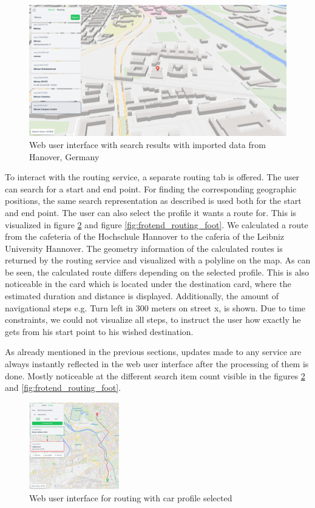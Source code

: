 \documentclass[conference]{IEEEtran}
\begin{document}
\begin{figure}[h]
    \centering
    \includegraphics[width=\textwidth]{figures/Mensa.png}
    \caption{Web user interface with search results with imported data from Hanover, Germany}
    \label{fig:frontend_search}
\end{figure}

To interact with the routing service, a separate routing tab is offered. The user can search for a start and end point. For finding the corresponding geographic positions, the same search representation as described is used both for the start and end point. The user can also select the profile it wants a route for. This is visualized in figure \ref{fig:frotend_routing_car} and figure \ref{fig:frotend_routing_foot}. We calculated a route from the cafeteria of the Hochschule Hannover to the caferia of the Leibniz University Hannover. The geometry information of the calculated routes is returned by the routing service and visualized with a polyline on the map. As can be seen, the calculated route differs depending on the selected profile. This is also noticeable in the card which is located under the destination card, where the estimated duration and distance is displayed. Additionally, the amount of navigational steps e.g. Turn left in 300 meters on street x, is shown. Due to time constraints, we could not visualize all steps, to instruct the user how exactly he gets from his start point to his wished destination.

As already mentioned in the previous sections, updates made to any service are always instantly reflected in the web user interface after the processing of them is done. Mostly noticeable at the different search item count visible in the figures \ref{fig:frotend_routing_car} and \ref{fig:frotend_routing_foot}.

\begin{figure}[H]
    \centering
    \includegraphics[width=0.35\textwidth]{figures/routing-1.png}
    \caption{Web user interface for routing with car profile selected}
    \label{fig:frotend_routing_car}
\end{figure}
\end{document}
